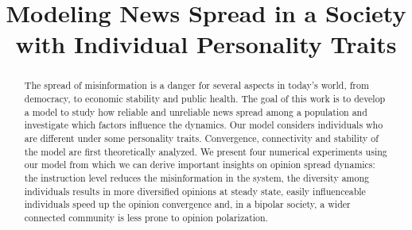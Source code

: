 \documentclass[10pt,conference]{IEEEtran}
\begin{document}
\title{Modeling News Spread in a Society with Individual Personality Traits\\}

\author{
\and
{}
\and
{}
}

\maketitle

\begin{abstract}
The spread of misinformation is a danger for several aspects in today's world, from democracy, to economic stability and public health. The goal of this work is to develop a model to study how reliable and unreliable news spread among a population and investigate which factors influence the dynamics. Our model considers individuals who are different under some personality traits. Convergence, connectivity and stability of the model are first theoretically analyzed. We present four numerical experiments using our model from which we can derive important insights on opinion spread dynamics: the instruction level reduces the misinformation in the system, the diversity among individuals results in more diversified opinions at steady state, easily influenceable individuals speed up the opinion convergence and, in a bipolar society, a wider connected community is less prone to opinion polarization.
\end{abstract}









\cleardoublepage



\appendix

\end{document}
